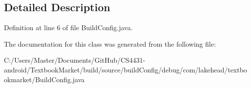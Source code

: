 \subsection{Detailed Description}


Definition at line 6 of file Build\-Config.\-java.



The documentation for this class was generated from the following file\-:\begin{DoxyCompactItemize}
\item 
C\-:/\-Users/\-Master/\-Documents/\-Git\-Hub/\-C\-S4431-\/android/\-Textbook\-Market/build/source/build\-Config/debug/com/lakehead/textbookmarket/Build\-Config.\-java\end{DoxyCompactItemize}
